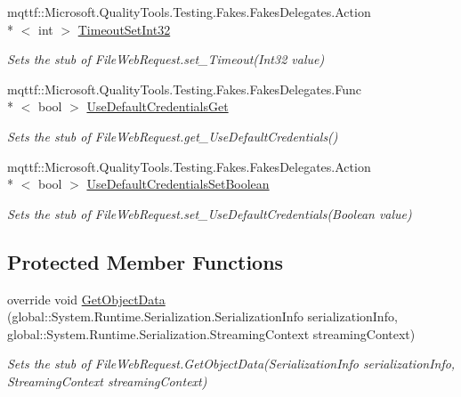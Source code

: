 \begin{DoxyCompactItemize}
mqttf\-::\-Microsoft.\-Quality\-Tools.\-Testing.\-Fakes.\-Fakes\-Delegates.\-Action\\*
$<$ int $>$ \hyperlink{class_system_1_1_net_1_1_fakes_1_1_stub_file_web_request_a8668dfc2ed5235b3bca9da528c67d72d}{Timeout\-Set\-Int32}
\begin{DoxyCompactList}\small\item\em Sets the stub of File\-Web\-Request.\-set\-\_\-\-Timeout(\-Int32 value)\end{DoxyCompactList}\item 
mqttf\-::\-Microsoft.\-Quality\-Tools.\-Testing.\-Fakes.\-Fakes\-Delegates.\-Func\\*
$<$ bool $>$ \hyperlink{class_system_1_1_net_1_1_fakes_1_1_stub_file_web_request_aae07f17b2122f892a6f938fff4f52ad5}{Use\-Default\-Credentials\-Get}
\begin{DoxyCompactList}\small\item\em Sets the stub of File\-Web\-Request.\-get\-\_\-\-Use\-Default\-Credentials()\end{DoxyCompactList}\item 
mqttf\-::\-Microsoft.\-Quality\-Tools.\-Testing.\-Fakes.\-Fakes\-Delegates.\-Action\\*
$<$ bool $>$ \hyperlink{class_system_1_1_net_1_1_fakes_1_1_stub_file_web_request_a3bbe240829797918a6d03f1166b07419}{Use\-Default\-Credentials\-Set\-Boolean}
\begin{DoxyCompactList}\small\item\em Sets the stub of File\-Web\-Request.\-set\-\_\-\-Use\-Default\-Credentials(\-Boolean value)\end{DoxyCompactList}\end{DoxyCompactItemize}
\subsection*{Protected Member Functions}
\begin{DoxyCompactItemize}
\item 
override void \hyperlink{class_system_1_1_net_1_1_fakes_1_1_stub_file_web_request_a4f6246b754232906957f202c7cdd218f}{Get\-Object\-Data} (global\-::\-System.\-Runtime.\-Serialization.\-Serialization\-Info serialization\-Info, global\-::\-System.\-Runtime.\-Serialization.\-Streaming\-Context streaming\-Context)
\begin{DoxyCompactList}\small\item\em Sets the stub of File\-Web\-Request.\-Get\-Object\-Data(\-Serialization\-Info serialization\-Info, Streaming\-Context streaming\-Context)\end{DoxyCompactList}\end{DoxyCompactItemize}
